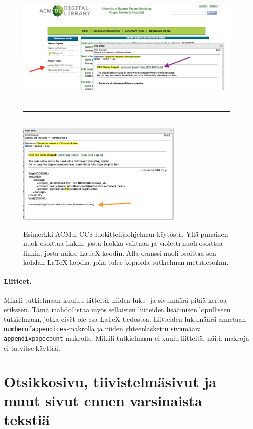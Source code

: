 \begin{figure}[tbp]
  \centering
  \includegraphics[height=6cm]{ccs_overview}\\[1em]
  \rule{\textwidth}{0.4pt}\\[1em]
  \includegraphics[height=5cm]{ccs_latex_code}
  \caption[Esimerkki ACM:n CCS:n käytöstä]{Esimerkki ACM:n CCS-luokittelijaohjelman käytöstä. Yllä punainen nuoli osoittaa linkin, josta luokka valitaan ja violetti nuoli osoittaa linkin, josta näkee \LaTeX-koodin. Alla oranssi nuoli osoittaa sen kohdan \LaTeX-koodia, joka tulee kopioida tutkielman metatietoihin. }
  \label{fig:latex:ccs}
\end{figure}

\paragraph{Liitteet.}
Mikäli tutkielmaan kuuluu liitteitä, niiden luku- ja sivumäärä pitää kertoa erikseen. Tämä mahdollistaa myös sellaisten liitteiden lisäämisen lopulliseen tutkielmaan, jotka eivät ole osa \LaTeX-tiedostoa. Liitteiden lukumäärä annetaan \texttt{numberofappendices}-makrolla ja niiden yhteenlaskettu sivumäärä \texttt{appendixpagecount}-makrolla. Mikäli tutkielmaan ei kuulu liitteitä, näitä makroja ei tarvitse käyttää.

\section{Otsikkosivu, tiivistelmäsivut ja muut sivut ennen varsinaista tekstiä}
\label{sec:latex:frontmatter}


